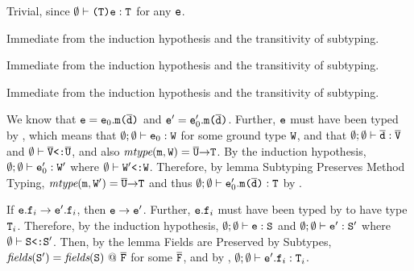 {\begin{description}
Trivial, since $\eproves{\typ{\cast{\T}{\e}}{\T}}$ for any $\e$.


Immediate from the induction hypothesis and the transitivity of subtyping.


Immediate from the induction hypothesis and the transitivity of subtyping.


Immediate from the induction hypothesis and the transitivity of subtyping.


We know that ${\e = {\invoke {\e_0} {\mof \dd}}}$ and $\ep = \invoke {\e_0'}
{\mof \dd}$. Further, $\e$ must have been typed by ,
which means that $\eept {\e_0} \W$ for some ground type $\W$, and that
$\eept \od \oV$ and $\esub \oV \oU$, and also $\mtype \m \W = \arrType
\oU \T$.  By the induction hypothesis, $\eept {\e_0'} \Wp$ where $\esub
\Wp \W$.  Therefore, by lemma Subtyping Preserves Method Typing,
$\mtype \m \Wp = \arrType \oU \T$ and thus $\eept {\invoke {\e_0'}
 {\mof \dd}} \T$ by .


If $\trans {\invoke \e \f_i} {\invoke \ep \f_i}$, then $\trans \e
\ep$.  Further, ${\invoke \e \f_i}$ must have been typed by
 to have type $\T_i$.  Therefore, by the induction
hypothesis, $\eept \e \SSS$ and $\eept \ep \Sp$ where $\esub \SSS
\Sp$.  Then, by the lemma Fields are Preserved by Subtypes, $\fields
\Sp = \fields {\SSS}\ @\ \oF$ for some $\oF$, and by
, $\eept {\invoke \ep \f_i} \T_i$.

\end{description}
}

